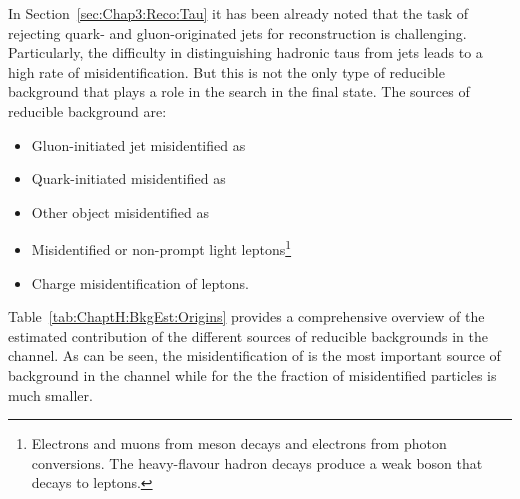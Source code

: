 In Section~\ref{sec:Chap3:Reco:Tau} it has been already noted that the task of rejecting 
quark- and gluon-originated jets for \tauhad reconstruction is challenging. 
Particularly, the difficulty in distinguishing hadronic taus 
from jets leads to a high rate of misidentification. %
But this is not the only type of reducible background that plays a role in the 
\tHq search in the \dileptau final state. The sources of reducible background are:
\begin{itemize}
	\item Gluon-initiated jet misidentified as \tauhad
	\item Quark-initiated misidentified as \tauhad
	\item Other object misidentified as \tauhad
	\item Misidentified or non-prompt light leptons\footnote{ Electrons and muons from meson decays and electrons from photon conversions. The heavy-flavour hadron decays produce a weak boson that decays to leptons.}
	\item Charge misidentification of leptons. 
\end{itemize}

Table~\ref{tab:ChaptH:BkgEst:Origins} provides a comprehensive overview of the estimated contribution of the different
sources of reducible backgrounds in the \dileptau channel. As can be seen, the misidentification of \tauhad is the most important
source of background in the \dilepOStau channel while for the \dilepSStau the fraction of misidentified particles is much smaller. 

